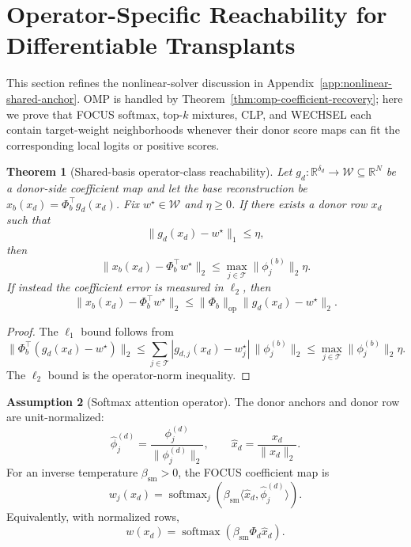 \documentclass{article}
\theoremstyle{plain}
\newtheorem{theorem}{Theorem}[section]
\theoremstyle{definition}
\newtheorem{assumption}[theorem]{Assumption}
\theoremstyle{remark}
\begin{document}
\section{Operator-Specific Reachability for Differentiable Transplants}
\label{app:operator-specific-reachability}

This section refines the nonlinear-solver discussion in Appendix~\ref{app:nonlinear-shared-anchor}. OMP is handled by Theorem~\ref{thm:omp-coefficient-recovery}; here we prove that FOCUS softmax, top-$k$ mixtures, CLP, and WECHSEL each contain target-weight neighborhoods whenever their donor score maps can fit the corresponding local logits or positive scores.

\begin{theorem}[Shared-basis operator-class reachability]
\label{thm:operator-class-reachability}
Let $g_d:\mathbb{R}^{\delta_d}\to\mathcal{W}\subseteq\mathbb{R}^{N}$ be a donor-side coefficient map and let the base reconstruction be $x_b(x_d)=\Phi_b^\top g_d(x_d)$. Fix $w^\star\in\mathcal{W}$ and $\eta\ge 0$. If there exists a donor row $x_d$ such that
\[
\|g_d(x_d)-w^\star\|_1\le \eta,
\]
then
\[
\|x_b(x_d)-\Phi_b^\top w^\star\|_2
\le
\max_{j\in\mathcal{T}}\|\phi_j^{(b)}\|_2\eta.
\]
If instead the coefficient error is measured in $\ell_2$, then
\[
\|x_b(x_d)-\Phi_b^\top w^\star\|_2
\le
\|\Phi_b\|_{\mathrm{op}}\|g_d(x_d)-w^\star\|_2.
\]
\end{theorem}

\begin{proof}
The $\ell_1$ bound follows from
\[
\|\Phi_b^\top(g_d(x_d)-w^\star)\|_2
\le
\sum_{j\in\mathcal{T}}|g_{d,j}(x_d)-w_j^\star|\,\|\phi_j^{(b)}\|_2
\le
\max_{j\in\mathcal{T}}\|\phi_j^{(b)}\|_2\eta.
\]
The $\ell_2$ bound is the operator-norm inequality.
\end{proof}

\begin{assumption}[Softmax attention operator]
\label{ass:softmax-attention-operator}
The donor anchors and donor row are unit-normalized:
\[
\widehat{\phi}^{(d)}_j=\frac{\phi^{(d)}_j}{\|\phi^{(d)}_j\|_2},
\qquad
\widehat{x}_d=\frac{x_d}{\|x_d\|_2}.
\]
For an inverse temperature $\beta_{\mathrm{sm}}>0$, the FOCUS coefficient map is
\[
w_j(x_d)=\operatorname{softmax}_j\left(\beta_{\mathrm{sm}}\langle \widehat{x}_d,\widehat{\phi}^{(d)}_j\rangle\right).
\]
Equivalently, with normalized rows,
\[
w(x_d)=\operatorname{softmax}(\beta_{\mathrm{sm}}\Phi_d\widehat{x}_d).
\]
\end{assumption}
\end{document}
